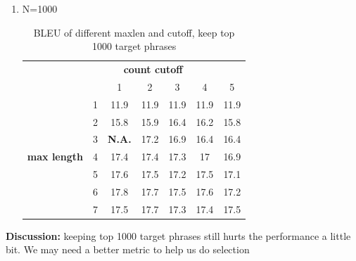 \documentclass[11pt, letterpaper]{article}   	%
\begin{document}
\begin{enumerate}
\begin{enumerate}
\item N=1000
\begin{table}[H]
\centering
\begin{tabular}{ c c | c | c | c | c|c }
& \multicolumn{5}{c}{\bf{ count cutoff}}  \\
&  & 1 &	2 &	3 &	4 &	5\\
\hline
\multirow{7}{*}{\bf{max length}}
& 1 &	11.9 &	11.9 &	11.9 &	11.9 &	11.9\\
\cline{2-7}
& 2 &	15.8 &	15.9 &	16.4 &	16.2 &	15.8\\
\cline{2-7}
& 3 &	\bf{N.A.} &	17.2 &	16.9 &	16.4 &	16.4\\
\cline{2-7}
& 4 &	17.4 &	17.4 &	17.3 &	17 &	16.9\\
\cline{2-7}
& 5 &	17.6 &	17.5 &	17.2 &	17.5 &	17.1\\
\cline{2-7}
& 6 &	17.8 &	17.7 &	17.5 &	17.6 &	17.2\\
\cline{2-7}
& 7 &	17.5 &	17.7 &	17.3 &	17.4 &	17.5\\
\hline
\end{tabular}
\caption{BLEU of different maxlen and cutoff, keep top 1000 target phrases}
\end{table}
\end{enumerate}
\textbf{Discussion:} keeping top 1000 target phrases still hurts the performance a little bit. We may need a better metric to help us do selection

\end{enumerate}
\end{document}
